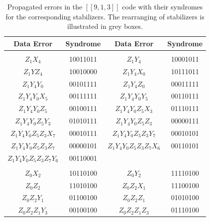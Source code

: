 \documentclass[reprint, amsmath,amssymb, aps,pra,
 floatfix,
]{revtex4-2}
\newcommand{\PadCell}[1]{\kern8pt#1\kern8pt}
\newcommand{\PadCellColor}[2]{\cellcolor{#1}\kern8pt#2\kern8pt}
\begin{document}
\begin{table}[h]
\centering
\scriptsize
  \setlength{\tabcolsep}{0pt} %
  \renewcommand{\arraystretch}{1.4} %

  \begin{tabular}{|c|c|c|c|}
    \hline
    \textbf{ Data Error } & \textbf{ Syndrome } & \textbf{ Data Error } & \textbf{ Syndrome } \\ \hline

    \rowcolor{gray!20}
    \multicolumn{4}{|c|}{\boldmath\textbf{$Y_0 Z_1 Z_3 Y_4 Z_5 Z_6 Z_7Z_8$} $\longrightarrow$ $Z_1Y_4Y_0Z_5Z_3 Z_7Z_6Z_8$} \\ \hline

    $Z_1X_4$  & 10011011  & $Z_1Y_4$    &  10001011      \\ \hline
    $Z_1YZ_4$  & 10010000  & $Z_1Y_4X_0$   &  10111011      \\ \hline
    $Z_1Y_4Y_0$  & 00101111  & $Z_1Y_4Z_0$    & 00011111      \\ \hline
    $Z_1Y_4Y_0X_5$  & 00111111  & $Z_1Y_4Y_0Y_5$    &  00110111      \\ \hline
    $Z_1Y_4Y_0Z_5$  & 00100111  & $Z_1Y_4Y_0Z_5X_3$    & 01110111      \\ \hline
    $Z_1Y_4Y_0Z_5Y_3$    &  01010111   & $Z_1Y_4Y_0Z_5Z_3$    &  00000111      \\ \hline
     $Z_1Y_4Y_0Z_5Z_3X_7$    &  00010111   & $Z_1Y_4Y_0Z_5Z_3Y_7$    &  00010101      \\ \hline

    $Z_1Y_4Y_0Z_5Z_3Z_7$    &  00000101   & $Z_1Y_4Y_0Z_5Z_3Z_7X_6$    &  00110101      \\ \hline

     $Z_1Y_4Y_0Z_5Z_3Z_7Y_6$    & 00110001   & &    \\ \hline


    
\rowcolor{gray!20}
    \multicolumn{4}{|c|}{\boldmath\textbf{$Z_0Z_1 Z_2 X_3Z_6$} $\longrightarrow$ $Z_0Z_2Z_1X_3Z_6$} \\ \hline

   $Z_0X_2$  & 10110100  & $Z_0Y_2$    &  11110100      \\ \hline
   $Z_0Z_2$  & 11010100  & $Z_0Z_2X_1$    &  11100100      \\ \hline
   $Z_0Z_2Y_1$  & 01100100  & $Z_0Z_2Z_1$    &  01010100      \\ \hline
   $Z_0Z_2Z_1Y_3$  & 00100100  & $Z_0Z_2Z_1Z_3$    &  01110100      \\ \hline

  \end{tabular}
\caption{Propagated errors in the $[[9,1,3]]$ code with their syndromes for the corresponding stabilizers.
The rearranging of stabilizers is illustrated in grey boxes. 
}
\label{tab:errors_due_to_faults_9_1}
\end{table}
\end{document}
